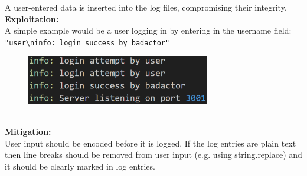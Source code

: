 \documentclass[]{article}
\begin{document}
A user-entered data is inserted into the log files, compromising their integrity.
\\ \textbf{Exploitation:} \\ A simple example would be a user logging in by entering in the username field:
\texttt{"user\textbackslash ninfo: login success by badactor"}
\begin{figure}[h]
\includegraphics[width=8cm]{images/log_inj.eps}
\centering
\end{figure}
\\ \textbf{Mitigation:} \\
User input should be encoded before it is logged. If the log entries are plain text then line breaks should be removed from user input (e.g. using string.replace) and it should be clearly marked in log entries.
\end{document}
